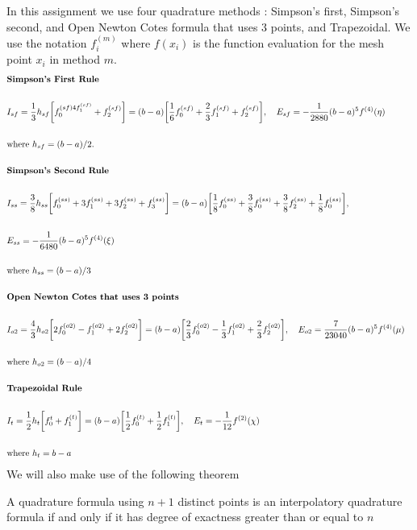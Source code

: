 \documentclass[12pt]{article}
\newenvironment{theorem}[2][]{\begin{trivlist}
\item[{\bfseries #1}\hskip \labelsep {\bfseries #2.}]}{\end{trivlist}}
\theoremstyle{remark}
\begin{document}
In this assignment we use four quadrature methods : Simpson's first, Simpson's second, and Open Newton Cotes formula that uses 3 points, and Trapezoidal. We use  the notation $f_i^{(m)}$ where $f(x_i)$ is the function evaluation for the mesh point $x_i$ in method $m$. 
\begin{align*}
& \textbf{Simpson's First Rule} \hskip 12.5cm \\ \\
& I_{sf} = \frac{1}{3}h_{sf}\bigg[f_0^{(sf) 4f_1^{(sf)}} + f_2^{(sf)}\bigg] = (b-a)\bigg[\frac{1}{6}f_0^{(sf)} + \frac{2}{3}f_1^{(sf)} + f_2^{(sf)}\bigg], \quad E_{sf} = -\frac{1}{2880}(b-a)^5f^{(4)}(\eta) \\ \\
& \text{where $h_{sf} = (b-a)/2$.} \\ \\
& \textbf{Simpson's Second Rule} \\ \\
& I_{ss} = \frac{3}{8}h_{ss}\bigg[f_0^{(ss)} + 3f_1^{(ss)} + 3f_2^{(ss)} + f_3^{(ss)}\bigg] = (b-a)\bigg[\frac{1}{8}f_0^{(ss)} + \frac{3}{8}f_0^{(ss)} + \frac{3}{8}f_2^{(ss)} + \frac{1}{8}f_0^{(ss)}\bigg], \\ \\
& E_{ss} = -\frac{1}{6480}(b-a)^5f^{(4)}(\xi) \\ \\
& \text{where $h_{ss} = (b-a)/3$} \\ \\
& \textbf{Open Newton Cotes that uses 3 points} \\ \\
& I_{o2} = \frac{4}{3}h_{o2}\bigg[2f_0^{(o2)} - f_1^{(o2)} + 2f_2^{(o2)}\bigg] = (b-a)\bigg[\frac{2}{3}f_0^{(o2)} - \frac{1}{3}f_1^{(o2)} + \frac{2}{3}f_2^{(o2)}\bigg], \quad E_{o2} = \frac{7}{23040}(b-a)^5f^{(4)}(\mu) \\ \\
& \text{where $h_{o2} = (b-a)/4$} \\ \\
& \textbf{Trapezoidal Rule} \hskip 13cm \\ \\
& I_{t} = \frac{1}{2}h_{t}\bigg[f_0^{t} + f_1^{(t)}\bigg] = (b-a)\bigg[\frac{1}{2}f_0^{(t)} + \frac{1}{2}f_1^{(t)}\bigg], \quad E_t = -\frac{1}{12}f^{(2)}(\chi) \\ \\
& \text{where $h_t = b-a$}
\end{align*}
We will also make use of the following theorem
\begin{theorem}{Theorem 1}
	A quadrature formula using $n + 1$ distinct points is an
	interpolatory quadrature formula if and only if it has degree of exactness greater than or equal to $n$
\end{theorem}
\newpage
\end{document}
